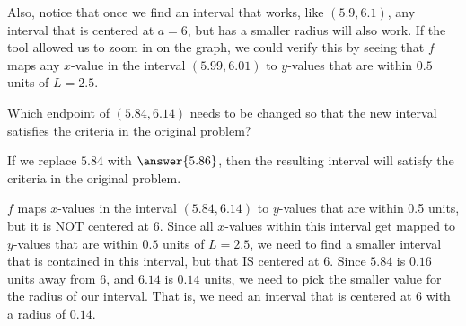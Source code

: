 \documentclass{ximera}
\begin{document}
\begin{exercise}
\begin{question}
\begin{feedback}
 			Also, notice that once we find an interval that works, like $ (5.9, 6.1)$, any interval that is centered at $a=6$, but has a smaller radius will also work.  If the tool allowed us to zoom in on the graph, we could verify this by seeing that $f$ maps any $x$-value in the interval $ (5.99, 6.01) $ to $y$-values that are within $0.5$ units of $L=2.5$.
 		\end{feedback}
 		\begin{question}
 			Which endpoint of $ (5.84, 6.14) $ needs to be changed so that the new interval satisfies the criteria in the original problem?  
 			\begin{question}
 				If we replace $5.84$ with $\answer{5.86}$, then the resulting interval will satisfy the criteria in the original problem. 
				\begin{feedback}
					$f$ maps $x$-values in the interval $ (5.84, 6.14) $ to $y$-values that are within 0.5 units, but it is NOT centered at $6$.  Since all $x$-values within this interval get mapped to $y$-values that are within $0.5$ units of $L=2.5$, we need to find a smaller interval that is contained in this interval, but that IS centered at $6$.  Since $5.84$ is $0.16$ units away from $6$, and $6.14$ is $0.14$ units, we need to pick the smaller value for the radius of our interval.  That is, we need an interval that is centered at $6$ with a radius of $0.14$.  
				\end{feedback}
			\end{question}
 		\end{question}
 	\end{question}
    \end{exercise}
\end{document}
